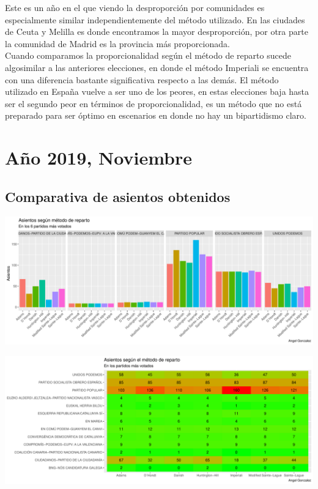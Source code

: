 \documentclass[12pt,a4paper,]{book}
\numberwithin{dummy}{section}
\theoremstyle{ocrenumbox}
\theoremstyle{blacknumex}
\theoremstyle{blacknumbox}
\theoremstyle{ocrenum}
\theoremstyle{ocrenum}
\begin{document}
Este es un año en el que viendo la desproporción por comunidades es
especialmente similar independientemente del método utilizado. En las
ciudades de Ceuta y Melilla es donde encontramos la mayor desproporción,
por otra parte la comunidad de Madrid es la provincia más
proporcionada.\\
Cuando comparamos la proporcionalidad según el método de reparto sucede
algosimilar a las anteriores elecciones, en donde el método Imperiali se
encuentra con una diferencia bastante significativa respecto a las
demás. El método utilizado en España vuelve a ser uno de los peores, en
estas elecciones baja hasta ser el segundo peor en términos de
proporcionalidad, es un método que no está preparado para ser óptimo en
escenarios en donde no hay un bipartidismo claro.

\hypertarget{auxf1o-2019-noviembre}{%
\section{Año 2019, Noviembre}\label{auxf1o-2019-noviembre}}

\hypertarget{comparativa-de-asientos-obtenidos-14}{%
\subsection{Comparativa de asientos
obtenidos}\label{comparativa-de-asientos-obtenidos-14}}

\begin{center}\includegraphics[width=1\linewidth]{figurasR/unnamed-chunk-118-1} \end{center}

\begin{center}\includegraphics[width=1\linewidth]{figurasR/unnamed-chunk-118-2} \end{center}
\end{document}
